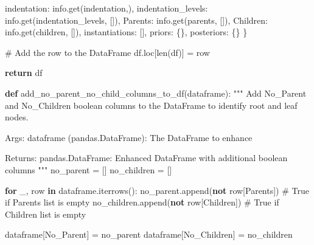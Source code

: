 \documentclass[
  11pt,
  letterpaper,
]{book}
\newenvironment{Shaded}{\begin{snugshade}}{\end{snugshade}}
\newcommand{\BuiltInTok}[1]{\textcolor[rgb]{0.00,0.23,0.31}{#1}}
\newcommand{\CommentTok}[1]{\textcolor[rgb]{0.37,0.37,0.37}{#1}}
\newcommand{\ControlFlowTok}[1]{\textcolor[rgb]{0.00,0.23,0.31}{\textbf{#1}}}
\newcommand{\KeywordTok}[1]{\textcolor[rgb]{0.00,0.23,0.31}{\textbf{#1}}}
\newcommand{\NormalTok}[1]{\textcolor[rgb]{0.00,0.23,0.31}{#1}}
\newcommand{\OperatorTok}[1]{\textcolor[rgb]{0.37,0.37,0.37}{#1}}
\newcommand{\StringTok}[1]{\textcolor[rgb]{0.13,0.47,0.30}{#1}}
\begin{document}
\begin{Shaded}
\begin{Highlighting}[]
                \StringTok{\textquotesingle{}indentation\textquotesingle{}}\NormalTok{: info.get(}\StringTok{\textquotesingle{}indentation\textquotesingle{}}\NormalTok{,}\StringTok{\textquotesingle{}\textquotesingle{}}\NormalTok{),}
                \StringTok{\textquotesingle{}indentation\_levels\textquotesingle{}}\NormalTok{: info.get(}\StringTok{\textquotesingle{}indentation\_levels\textquotesingle{}}\NormalTok{, []),}
                \StringTok{\textquotesingle{}Parents\textquotesingle{}}\NormalTok{: info.get(}\StringTok{\textquotesingle{}parents\textquotesingle{}}\NormalTok{, []),}
                \StringTok{\textquotesingle{}Children\textquotesingle{}}\NormalTok{: info.get(}\StringTok{\textquotesingle{}children\textquotesingle{}}\NormalTok{, []),}
                \StringTok{\textquotesingle{}instantiations\textquotesingle{}}\NormalTok{: [],}
                \StringTok{\textquotesingle{}priors\textquotesingle{}}\NormalTok{: \{\},}
                \StringTok{\textquotesingle{}posteriors\textquotesingle{}}\NormalTok{: \{\}}
\NormalTok{            \}}

        \CommentTok{\# Add the row to the DataFrame}
\NormalTok{        df.loc[}\BuiltInTok{len}\NormalTok{(df)] }\OperatorTok{=}\NormalTok{ row}

    \ControlFlowTok{return}\NormalTok{ df}

\KeywordTok{def}\NormalTok{ add\_no\_parent\_no\_child\_columns\_to\_df(dataframe):}
    \CommentTok{"""}
\CommentTok{    Add No\_Parent and No\_Children boolean columns to the DataFrame to identify root and leaf nodes.}

\CommentTok{    Args:}
\CommentTok{        dataframe (pandas.DataFrame): The DataFrame to enhance}

\CommentTok{    Returns:}
\CommentTok{        pandas.DataFrame: Enhanced DataFrame with additional boolean columns}
\CommentTok{    """}
\NormalTok{    no\_parent }\OperatorTok{=}\NormalTok{ []}
\NormalTok{    no\_children }\OperatorTok{=}\NormalTok{ []}

    \ControlFlowTok{for}\NormalTok{ \_, row }\KeywordTok{in}\NormalTok{ dataframe.iterrows():}
\NormalTok{        no\_parent.append(}\KeywordTok{not}\NormalTok{ row[}\StringTok{\textquotesingle{}Parents\textquotesingle{}}\NormalTok{])  }\CommentTok{\# True if Parents list is empty}
\NormalTok{        no\_children.append(}\KeywordTok{not}\NormalTok{ row[}\StringTok{\textquotesingle{}Children\textquotesingle{}}\NormalTok{])  }\CommentTok{\# True if Children list is empty}

\NormalTok{    dataframe[}\StringTok{\textquotesingle{}No\_Parent\textquotesingle{}}\NormalTok{] }\OperatorTok{=}\NormalTok{ no\_parent}
\NormalTok{    dataframe[}\StringTok{\textquotesingle{}No\_Children\textquotesingle{}}\NormalTok{] }\OperatorTok{=}\NormalTok{ no\_children}


\end{Highlighting}
\end{Shaded}
\end{document}
